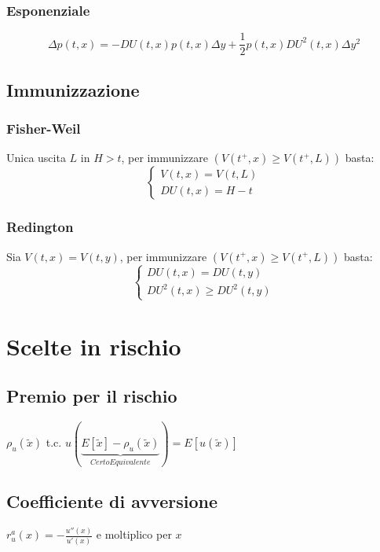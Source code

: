 \documentclass[a4paper,notitlepage]{report}%
\begin{document}
\begin{multicols*}{2}
        \subsubsection*{Esponenziale}
        \[
            \Delta p(t,x) = -DU(t,x) p(t,x) \Delta y + \frac{1}{2} p(t,x) DU^2(t,x) \Delta y^2
        \]
    \subsection*{Immunizzazione}

        \subsubsection*{Fisher-Weil}
        Unica uscita $L$ in $H>t$, per immunizzare $(V(t^+,x)\geq V(t^+,L))$ basta:
        \[
            \left\{\begin{array}{l}
                V(t,x) = V(t,L)\\
                DU(t,x)=H-t
            \end{array}\right.
        \]

        \subsubsection*{Redington}
        Sia $V(t,x) = V(t,y)$, per immunizzare $(V(t^+,x)\geq V(t^+,L))$ basta:
        \[
            \left\{\begin{array}{l}
                DU(t,x)=DU(t,y) \\
                DU^2(t,x) \geq DU^2(t,y)
            \end{array}\right.
        \]

\section*{Scelte in rischio}

    \subsection*{Premio per il rischio}
    $\rho_u(\tilde{x})$ t.c. $u(\underbrace{E[\tilde{x}]-\rho_u(\tilde{x})}_{Certo Equivalente})=E[u(\tilde{x})]$

    \subsection*{Coefficiente di avversione}
    $r^a_u(x)=-\frac{u''(x)}{u'(x)}$ e moltiplico per $x$


\end{multicols*}
\end{document}
